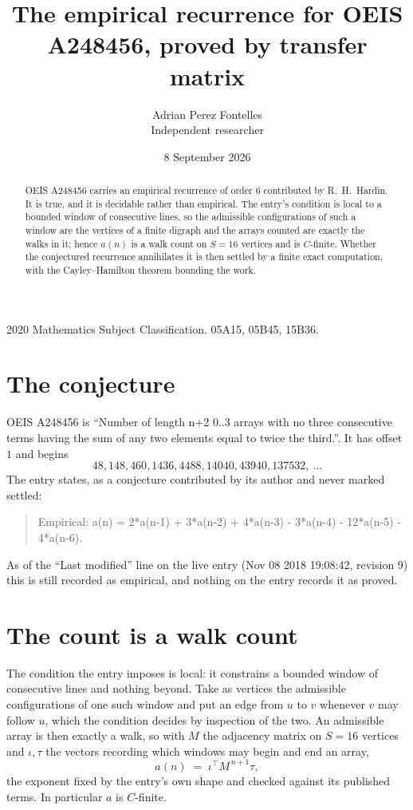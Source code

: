 \documentclass[11pt,a4paper]{article}
\title{The empirical recurrence for OEIS A248456, proved by transfer matrix}
\author{Adrian Perez Fontelles\\ \small Independent researcher}
\date{8 September 2026}
\theoremstyle{plain}
\theoremstyle{definition}
\begin{document}
\maketitle

\begin{abstract}
OEIS A248456 carries an empirical recurrence of order $6$ contributed by R.~H.~Hardin. It is
true, and it is decidable rather than empirical. The entry's condition is local to a bounded window of consecutive lines, so
the admissible configurations of such a window are the vertices of a finite digraph and the
arrays counted are exactly the walks in it; hence $a(n)$ is a walk count on $S=16$ vertices
and is $C$-finite. Whether the conjectured recurrence annihilates it is then settled by a
finite exact computation, with the Cayley--Hamilton theorem bounding the work.
\end{abstract}

\noindent\small 2020 Mathematics Subject Classification. 05A15, 05B45, 15B36.\normalsize

\section{The conjecture}

OEIS A248456 is ``Number of length n+2 0..3 arrays with no three consecutive terms having the sum of any two elements equal to twice the third.''. It has offset $1$ and begins
\[
48, 148, 460, 1436, 4488, 14040, 43940, 137532,\ \dots
\]
The entry states, as a conjecture contributed by its author and never marked settled:
\begin{quote}
Empirical: a(n) = 2*a(n-1) + 3*a(n-2) + 4*a(n-3) - 3*a(n-4) - 12*a(n-5) - 4*a(n-6).
\end{quote}
As of the ``Last modified'' line on the live entry (Nov 08 2018 19:08:42, revision 9) this is still
recorded as empirical, and nothing on the entry records it as proved.

\section{The count is a walk count}

The condition the entry imposes is local: it constrains a bounded window of consecutive lines and nothing beyond. Take as
vertices the admissible configurations of one such window and put an edge from $u$ to $v$
whenever $v$ may follow $u$, which the condition decides by inspection of the two. An
admissible array is then exactly a walk, so with $M$ the adjacency matrix on $S=16$ vertices
and $\iota,\tau$ the vectors recording which windows may begin and end an array,
\[
a(n)\;=\;\iota^{\!\top}M^{\,n+1}\tau ,
\]
the exponent fixed by the entry's own shape and checked against its published terms. In
particular $a$ is $C$-finite.
\end{document}
